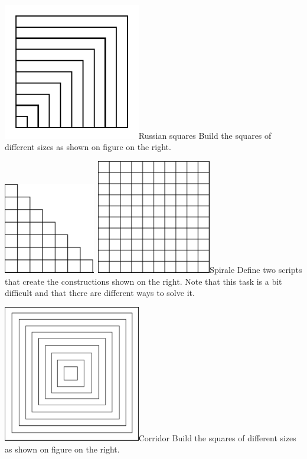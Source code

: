 \begin{exofigwithsizeandtitle}[0.5]{\includegraphics[width=6cm]{Argmirescr}}{Russian squares}\label{exo:russianSquaressimple}
Build the squares of different sizes as shown on figure on the right.
\end{exofigwithsizeandtitle}

\begin{exofigwithsizeandtitle}[0.35]{\includegraphics[width=4cm]{cubesandpyramid}\ \includegraphics[width=5cm]{damier}}{Spirale}\label{exo:spiralsimple}
Define two scripts that create the constructions shown on the right. Note that this task is a bit difficult and that there are different ways to solve it.
\end{exofigwithsizeandtitle}

\begin{exofigwithsizeandtitle}[0.5]{\includegraphics[width=6cm]{corridor}}{Corridor}\label{exo:corridorsimple}
Build the squares of different sizes as shown on figure on the right.
\end{exofigwithsizeandtitle}




\ifx\wholebook\relax\else
\fi
